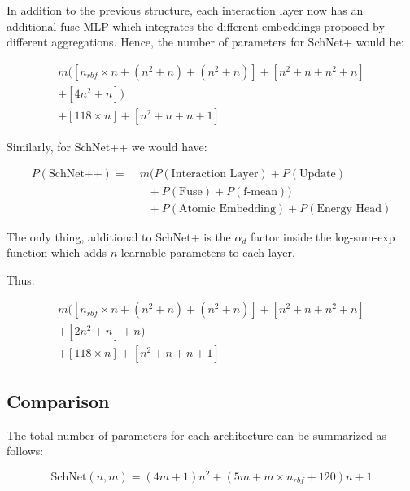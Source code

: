 \documentclass[sigconf, nonacm]{acmart}
\begin{document}
In addition to the previous structure, each interaction layer now has an additional fuse MLP which integrates the different embeddings proposed by different aggregations. Hence, the number of parameters for SchNet+ would be:

\begin{equation}
	\begin{split}
		m\Big(
		[n_{rbf} \times n + (n^2 + n) + (n^2 + n)]
		+ [n^2 + n + n^2 + n] \\
		+ [4n^2 + n]
		\Big)
		\\ + [118 \times n] + [n^2 + n + n + 1]
	\end{split}
\end{equation}

Similarly, for SchNet++ we would have:

\begin{equation}
	\begin{split}
		P(\text{SchNet++}) ={}&\;
		m\Big(
		P(\text{Interaction Layer})
		+ P(\text{Update}) \\
		&\quad
		+ P(\text{Fuse})
		+ P(\text{f-mean})
		\Big) \\
		&\quad
		+ P(\text{Atomic Embedding})
		+ P(\text{Energy Head})
	\end{split}
\end{equation}

The only thing, additional to SchNet+ is the $\alpha_d$ factor inside the log-sum-exp function which adds $n$ learnable parameters to each layer.

Thus:

\begin{equation}
	\begin{split}
		m\Big(
		[n_{rbf} \times n + (n^2 + n) + (n^2 + n)]
		+ [n^2 + n + n^2 + n] \\ 
		+ [2n^2 + n] + n
		\Big)
		\\ + [118 \times n] + [n^2 + n + n + 1]
	\end{split}
\end{equation}
\subsection{Comparison}
The total number of parameters for each architecture can be summarized as follows:

\begin{equation}
	\text{SchNet}(n,m) = \left(4m+1\right)n^2 + \left(5m + m\times n_{rbf} + 120\right)n + 1
\end{equation}
\end{document}
